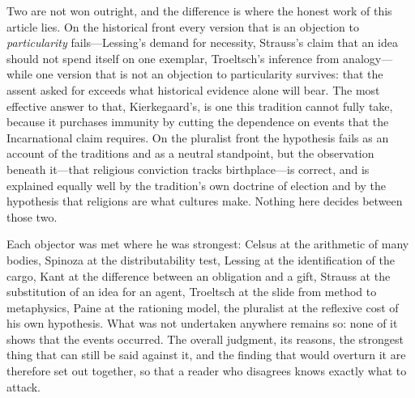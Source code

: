 Two are not won outright, and the difference is where the honest work of this article lies. On the historical front every version that is an objection to \emph{particularity} fails---Lessing's demand for necessity, Strauss's claim that an idea should not spend itself on one exemplar, Troeltsch's inference from analogy---while one version that is not an objection to particularity survives: that the assent asked for exceeds what historical evidence alone will bear. The most effective answer to that, Kierkegaard's, is one this tradition cannot fully take, because it purchases immunity by cutting the dependence on events that the Incarnational claim requires. On the pluralist front the hypothesis fails as an account of the traditions and as a neutral standpoint, but the observation beneath it---that religious conviction tracks birthplace---is correct, and is explained equally well by the tradition's own doctrine of election and by the hypothesis that religions are what cultures make. Nothing here decides between those two.

Each objector was met where he was strongest: Celsus at the arithmetic of many bodies, Spinoza at the distributability test, Lessing at the identification of the cargo, Kant at the difference between an obligation and a gift, Strauss at the substitution of an idea for an agent, Troeltsch at the slide from method to metaphysics, Paine at the rationing model, the pluralist at the reflexive cost of his own hypothesis. What was not undertaken anywhere remains so: none of it shows that the events occurred. The overall judgment, its reasons, the strongest thing that can still be said against it, and the finding that would overturn it are therefore set out together, so that a reader who disagrees knows exactly what to attack.

